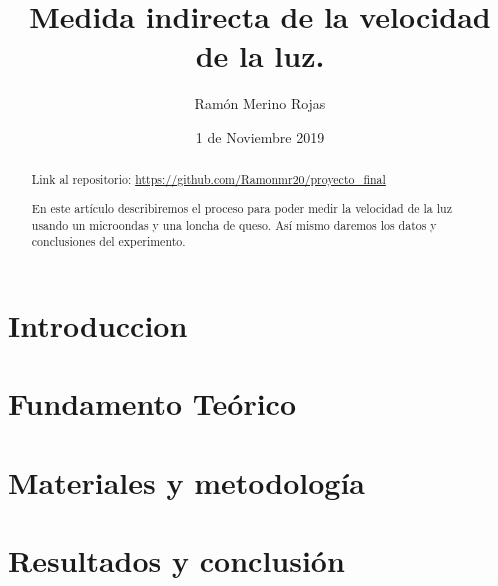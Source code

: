 \documentclass{article}
\title{Medida indirecta de la velocidad de la luz.}
\author{Ramón Merino Rojas}
\date{1 de Noviembre 2019}
\begin{document}
\maketitle
        
\begin{abstract}
Link al repositorio: \href{https://github.com/Ramonmr20/proyecto_final}{https://github.com/Ramonmr20/proyecto\_final}

En este artículo describiremos el proceso para poder medir la velocidad de la luz usando un microondas y una loncha de queso. Así mismo daremos los datos y conclusiones del experimento.


\end{abstract}
\section{Introduccion}


\section{Fundamento Teórico}

\section{Materiales y metodología}

\section{Resultados y conclusión}
\end{document}
